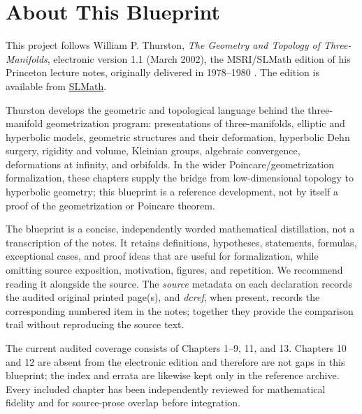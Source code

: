 

\chapter*{About This Blueprint}

This project follows William P. Thurston, \emph{The Geometry and Topology of
Three-Manifolds}, electronic version 1.1 (March 2002), the MSRI/SLMath edition
of his Princeton lecture notes, originally delivered in 1978--1980
\cite{thurstonGT3M}. The edition is available from
\href{https://library.slmath.org/nonmsri/gt3m/}{SLMath}.

Thurston develops the geometric and topological language behind the
three-manifold geometrization program: presentations of three-manifolds,
elliptic and hyperbolic models, geometric structures and their deformation,
hyperbolic Dehn surgery, rigidity and volume, Kleinian groups, algebraic
convergence, deformations at infinity, and orbifolds. In the wider
Poincare/geometrization formalization, these chapters supply the bridge from
low-dimensional topology to hyperbolic geometry; this blueprint is a reference
development, not by itself a proof of the geometrization or Poincare theorem.

The blueprint is a concise, independently worded mathematical distillation,
not a transcription of the notes. It retains definitions, hypotheses,
statements, formulas, exceptional cases, and proof ideas that are useful for
formalization, while omitting source exposition, motivation, figures, and
repetition. We recommend reading it alongside the source. The \emph{source}
metadata on each declaration records the audited original printed page(s), and
\emph{dcref}, when present, records the corresponding numbered item in the
notes; together they provide the comparison trail without reproducing the
source text.

The current audited coverage consists of Chapters 1--9, 11, and 13. Chapters
10 and 12 are absent from the electronic edition and therefore are not gaps in
this blueprint; the index and errata are likewise kept only in the reference
archive. Every included chapter has been independently reviewed for
mathematical fidelity and for source-prose overlap before integration.












